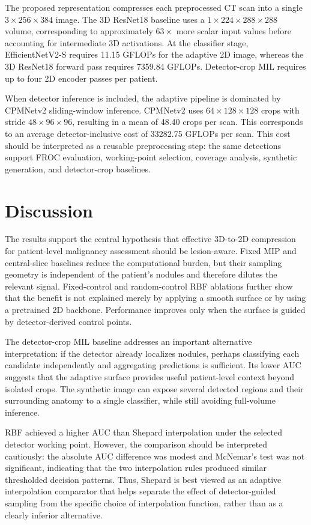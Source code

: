 \documentclass[preprint,12pt]{elsarticle}
\begin{document}
The proposed representation compresses each preprocessed CT scan into a single $3 \times 256 \times 384$ image. The 3D ResNet18 baseline uses a $1 \times 224 \times 288 \times 288$ volume, corresponding to approximately $63\times$ more scalar input values before accounting for intermediate 3D activations. At the classifier stage, EfficientNetV2-S requires 11.15 GFLOPs for the adaptive 2D image, whereas the 3D ResNet18 forward pass requires 7359.84 GFLOPs. Detector-crop MIL requires up to four 2D encoder passes per patient.

When detector inference is included, the adaptive pipeline is dominated by CPMNetv2 sliding-window inference. CPMNetv2 uses $64 \times 128 \times 128$ crops with stride $48 \times 96 \times 96$, resulting in a mean of 48.40 crops per scan. This corresponds to an average detector-inclusive cost of 33282.75 GFLOPs per scan. This cost should be interpreted as a reusable preprocessing step: the same detections support FROC evaluation, working-point selection, coverage analysis, synthetic generation, and detector-crop baselines.

\section{Discussion}

The results support the central hypothesis that effective 3D-to-2D compression for patient-level malignancy assessment should be lesion-aware. Fixed MIP and central-slice baselines reduce the computational burden, but their sampling geometry is independent of the patient's nodules and therefore dilutes the relevant signal. Fixed-control and random-control RBF ablations further show that the benefit is not explained merely by applying a smooth surface or by using a pretrained 2D backbone. Performance improves only when the surface is guided by detector-derived control points.

The detector-crop MIL baseline addresses an important alternative interpretation: if the detector already localizes nodules, perhaps classifying each candidate independently and aggregating predictions is sufficient. Its lower AUC suggests that the adaptive surface provides useful patient-level context beyond isolated crops. The synthetic image can expose several detected regions and their surrounding anatomy to a single classifier, while still avoiding full-volume inference.

RBF achieved a higher AUC than Shepard interpolation under the selected detector working point. However, the comparison should be interpreted cautiously: the absolute AUC difference was modest and McNemar's test was not significant, indicating that the two interpolation rules produced similar thresholded decision patterns. Thus, Shepard is best viewed as an adaptive interpolation comparator that helps separate the effect of detector-guided sampling from the specific choice of interpolation function, rather than as a clearly inferior alternative.
\end{document}
